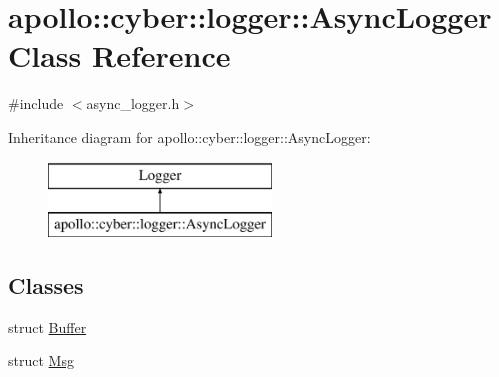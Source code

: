 \hypertarget{classapollo_1_1cyber_1_1logger_1_1AsyncLogger}{\section{apollo\-:\-:cyber\-:\-:logger\-:\-:Async\-Logger Class Reference}
\label{classapollo_1_1cyber_1_1logger_1_1AsyncLogger}
}


{\ttfamily \#include $<$async\-\_\-logger.\-h$>$}

Inheritance diagram for apollo\-:\-:cyber\-:\-:logger\-:\-:Async\-Logger\-:\begin{figure}[H]
\begin{center}
\leavevmode
\includegraphics[height=2.000000cm]{classapollo_1_1cyber_1_1logger_1_1AsyncLogger}
\end{center}
\end{figure}
\subsection*{Classes}
\begin{DoxyCompactItemize}
\item 
struct \hyperlink{structapollo_1_1cyber_1_1logger_1_1AsyncLogger_1_1Buffer}{Buffer}
\item 
struct \hyperlink{structapollo_1_1cyber_1_1logger_1_1AsyncLogger_1_1Msg}{Msg}
\end{DoxyCompactItemize}
